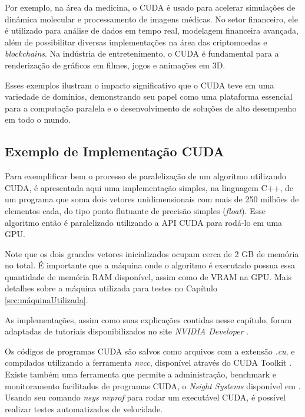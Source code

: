 \documentclass[12pt,
openright, 
oneside, %
a4paper,    %
brazil]{facom-ufu-abntex2}
\begin{document}
Por exemplo, na área da medicina, o CUDA é usado para acelerar simulações de dinâmica molecular e processamento de imagens médicas. No setor financeiro, ele é utilizado para análise de dados em tempo real, modelagem financeira avançada, além de possibilitar diversas implementações na área das criptomoedas e \textit{blockchains}. Na indústria de entretenimento, o CUDA é fundamental para a renderização de gráficos em filmes, jogos e animações em 3D.

Esses exemplos ilustram o impacto significativo que o CUDA teve em uma variedade de domínios, demonstrando seu papel como uma plataforma essencial para a computação paralela e o desenvolvimento de soluções de alto desempenho em todo o mundo.


\subsection{Exemplo de Implementação CUDA}
\label{ssc:implementaçãoCUDA}

Para exemplificar bem o processo de paralelização de um algoritmo utilizando CUDA, é apresentada aqui uma implementação simples, na linguagem C++, de um programa que soma dois vetores unidimensionais com mais de 250 milhões de elementos cada, do tipo ponto flutuante de precisão simples (\textit{float}). Esse algoritmo então é paralelizado utilizando a API CUDA para rodá-lo em uma GPU.

Note que os dois grandes vetores inicializados ocupam cerca de 2 GB de memória no total. É importante que a máquina onde o algoritmo é executado possua essa quantidade de memória RAM disponível, assim como de VRAM na GPU. Mais detalhes sobre a máquina utilizada para testes no Capítulo \ref{sec:máquinaUtilizada}.

As implementações, assim como suas explicações contidas nesse capítulo, foram adaptadas de tutoriais disponibilizados no site \textit{NVIDIA Developer} \cite{CUDAanEvenEasierIntro}.

Os códigos de programas CUDA são salvos como arquivos com a extensão \textit{.cu}, e compilados utilizando a ferramenta \textit{nvcc}, disponível através do CUDA Toolkit \cite{CUDAtoolkit}. Existe também uma ferramenta que permite a administração, benchmark e monitoramento facilitados de programas CUDA, o \textit{Nsight Systems} disponível em \cite{NVIDIAnsightSystems}. Usando seu comando \textit{nsys nvprof} para rodar um executável CUDA, é possível realizar testes automatizados de velocidade.
\end{document}
